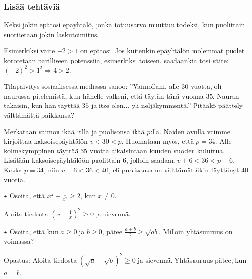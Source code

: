 \begin{tehtavasivu}
\subsubsection*{Lisää tehtäviä}

\begin{tehtava}
Keksi jokin epätosi epäyhtälö, jonka totuusarvo muuttuu todeksi, kun puolittain suoritetaan jokin laskutoimitus.
	\begin{vastaus}
	Esimerkiksi väite $-2>1$ on epätosi. Jos kuitenkin epäyhtälön molemmat puolet korotetaan parilliseen potenssiin, esimerkiksi toiseen, saadaankin tosi väite: $(-2)^2>1^2 \Rightarrow 4>2$.
	\end{vastaus}
\end{tehtava}

\begin{tehtava}
Tilapäivitys sosiaalisessa mediassa sanoo: ''Vaimollani, alle $30$ vuotta, oli naurussa pitelemistä, kun hänelle valkeni, että täytän tänä vuonna $35$. Nauran takaisin, kun hän täyttää $35$ ja itse olen... yli neljäkymmentä.'' Pitääkö päättely välttämättä paikkansa?
		\begin{vastaus}
		Merkataan vaimon ikää $v$:llä ja puolisonsa ikää $p$:llä. Näiden avulla voimme kirjoittaa kaksoisepäyhtälön $v<30<p$. Huomataan myös, että $p=34$. Alle kolmekymppinen täyttää $35$ vuotta aikaisintaan kuuden vuoden kuluttua. Lisätään kaksoisepäyhtälöön puolittain $6$, jolloin saadaan $v+6<36<p+6$. Koska $p=34$, niin $v+6<36<40$, eli puolisonsa on välttämättäkin täyttänyt $40$ vuotta.
		\end{vastaus}
\end{tehtava}

\begin{tehtava}
$\star$ Osoita, että $x^2+\frac{1}{x^2}\geq 2$, kun $x \neq 0$.
    \begin{vastaus}
     Aloita tiedosta $\left(x-\frac{1}{x}\right)^2 \geq 0$ ja sievennä.
    \end{vastaus}
\end{tehtava}

\begin{tehtava} 
$\star$ Osoita, että kun $a \geq 0$ ja $b \geq 0$, pätee $\frac{a+b}{2} \geq \sqrt{ab}$. Milloin yhtäsuuruus on voimassa?
    \begin{vastaus}
     Opastus: Aloita tiedosta $\left(\sqrt{a}-\sqrt{b}\right)^2 \geq 0$ ja sievennä. Yhtäsuuruus pätee, kun $a = b$.
    \end{vastaus}
\end{tehtava}


\end{tehtavasivu}
